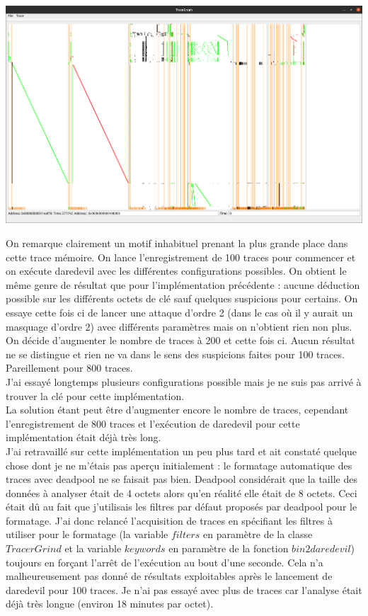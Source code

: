\documentclass[10pt,a4paper]{article}
\begin{document}
\begin{center}
\includegraphics[scale=0.11]{Images/777_sans_filtre.png}\\
\end{center}
On remarque clairement un motif inhabituel prenant la plus grande place dans cette trace mémoire.
On lance l'enregistrement de 100 traces pour commencer et on exécute daredevil avec les différentes configurations possibles. On obtient le même genre de résultat que pour l'implémentation précédente : aucune déduction possible sur les différents octets de clé sauf quelques suspicions pour certains. On essaye cette fois ci de lancer une attaque d'ordre 2 (dans le cas où il y aurait un masquage d'ordre 2) avec différents paramètres mais on n'obtient rien non plus.\\
On décide d'augmenter le nombre de traces à 200 et cette fois ci. Aucun résultat ne se distingue et rien ne va dans le sens des suspicions faites pour 100 traces. Pareillement pour 800 traces.\\
J'ai essayé longtemps plusieurs configurations possible mais je ne suis pas arrivé à trouver la clé pour cette implémentation.\\
La solution étant peut être d'augmenter encore le nombre de traces, cependant l'enregistrement de 800 traces et l'exécution de daredevil pour cette implémentation était déjà très long.\\
J'ai retravaillé sur cette implémentation un peu plus tard et ait constaté quelque chose dont je ne m'étais pas aperçu initialement : le formatage automatique des traces avec deadpool ne se faisait pas bien. Deadpool considérait que la taille des données à analyser était de 4 octets alors qu'en réalité elle était de 8 octets. Ceci était dû au fait que j'utilisais les filtres par défaut proposés par deadpool pour le formatage. J'ai donc relancé l'acquisition de traces en spécifiant les filtres à utiliser pour le formatage (la variable $filters$ en paramètre de la classe $TracerGrind$ et la variable $keywords$ en paramètre de la fonction $bin2daredevil$) toujours en forçant l'arrêt de l'exécution au bout d'une seconde. Cela n'a malheureusement pas donné de résultats exploitables après le lancement de daredevil pour 100 traces. Je n'ai pas essayé avec plus de traces car l'analyse était déjà très longue (environ 18 minutes par octet).
\end{document}
